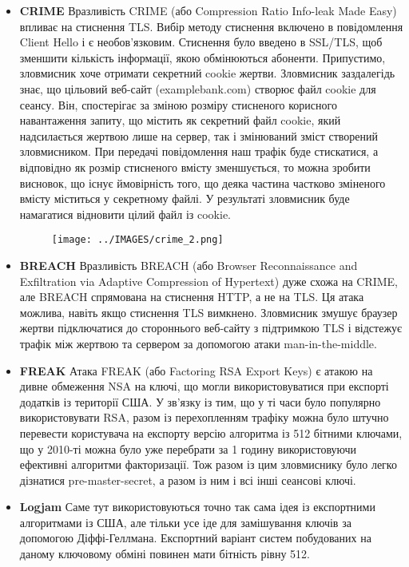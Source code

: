 \begin{itemize}
    
    
    \item \textbf{CRIME}
    Вразливість CRIME (або Compression Ratio Info-leak Made Easy) впливає на стиснення TLS. Вибір методу стиснення включено в повідомлення Client Hello і є необов’язковим. Стиснення було введено в SSL/TLS, щоб зменшити кількість інформації, якою обмінюються абоненти.
    Припустимо, зловмисник хоче отримати секретний cookie жертви. Зловмисник заздалегідь знає, що цільовий веб-сайт (examplebank.com) створює файл cookie для сеансу. Він, спостерігає за зміною розміру стисненого корисного навантаження запиту, що містить як секретний файл cookie, який надсилається жертвою лише на сервер, так і змінюваний зміст створений зловмисником. При передачі повідомлення наш трафік буде стискатися, а відповідно як розмір стисненого вмісту зменшується, то можна зробити висновок, що існує ймовірність того, що деяка частина частково зміненого вмісту міститься у секретному файлі. У результаті зловмисник буде намагатися відновити цілий файл із cookie.
    \begin{figure}[ht]
        \centering
        \texttt{[image: ../IMAGES/crime\_2.png]}
        \label{weak_keys_rc4}
    \end{figure}
    
    \item \textbf{BREACH}
    Вразливість BREACH (або Browser Reconnaissance and Exfiltration via Adaptive Compression of Hypertext) дуже схожа на CRIME, але BREACH спрямована на стиснення HTTP, а не на TLS. Ця атака можлива, навіть якщо стиснення TLS вимкнено. Зловмисник змушує браузер жертви підключатися до стороннього веб-сайту з підтримкою TLS і відстежує трафік між жертвою та сервером за допомогою атаки man-in-the-middle.
    
    \item \textbf{FREAK}
    Атака FREAK (або Factoring RSA Export Keys) є атакою на дивне обмеження NSA на ключі, що могли використовуватися при експорті додатків із території США. У зв'язку із тим, що у ті часи було популярно використовувати RSA, разом із перехопленням трафіку можна було штучно перевести користувача на експорту версію алгоритма із 512 бітними ключами, що у 2010-ті можна було уже перебрати за 1 годину використовуючи ефективні алгоритми факторизації. Тож разом із цим зловмиснику було легко дізнатися pre-master-secret, а разом із ним і всі інші сеансові ключі.
    
    \item \textbf{Logjam}
    Саме тут використовуються точно так сама ідея із експортними алгоритмами із США, але тільки усе іде для замішування ключів за допомогою Діффі-Геллмана. Експортний варіант систем побудованих на даному ключовому обміні повинен мати бітність рівну 512.
    

\end{itemize}
